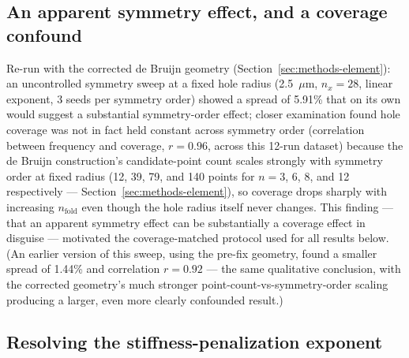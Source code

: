 \documentclass[11pt]{article}
\begin{document}
\subsection{An apparent symmetry effect, and a coverage confound}
\label{sec:confound}

Re-run with the corrected de Bruijn geometry (Section~\ref{sec:methods-element}): an uncontrolled symmetry sweep at a fixed hole radius (2.5~$\mu$m, $n_x=28$, linear exponent, 3 seeds per symmetry order) showed a spread of 5.91\% that on its own would suggest a substantial symmetry-order effect; closer examination found hole coverage was not in fact held constant across symmetry order (correlation between frequency and coverage, $r=0.96$, across this 12-run dataset) because the de Bruijn construction's candidate-point count scales strongly with symmetry order at fixed radius (12, 39, 79, and 140 points for $n=3$, 6, 8, and 12 respectively --- Section~\ref{sec:methods-element}), so coverage drops sharply with increasing $n_{\text{fold}}$ even though the hole radius itself never changes. This finding --- that an apparent symmetry effect can be substantially a coverage effect in disguise --- motivated the coverage-matched protocol used for all results below. (An earlier version of this sweep, using the pre-fix geometry, found a smaller spread of 1.44\% and correlation $r=0.92$ --- the same qualitative conclusion, with the corrected geometry's much stronger point-count-vs-symmetry-order scaling producing a larger, even more clearly confounded result.)

\subsection{Resolving the stiffness-penalization exponent}
\label{sec:exponent}
\end{document}
